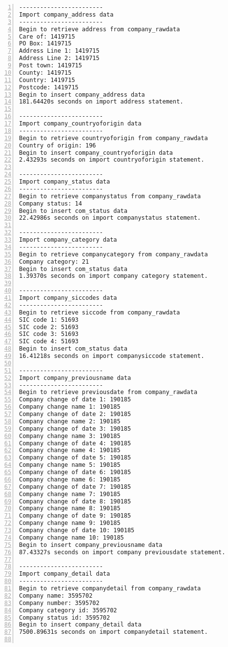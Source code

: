 \begin{lstlisting}[breaklines, frame=single, numbers=left, caption={Execution of Company Migration Program.}, label=commandline-02]
------------------------
Import company_address data 
------------------------
Begin to retrieve address from company_rawdata
Care of: 1419715 
PO Box: 1419715 
Address Line 1: 1419715 
Address Line 2: 1419715 
Post town: 1419715 
County: 1419715 
Country: 1419715 
Postcode: 1419715 
Begin to insert company_address data
181.64420s seconds on import address statement. 

------------------------
Import company_countryoforigin data 
------------------------
Begin to retrieve countryoforigin from company_rawdata
Country of origin: 196 
Begin to insert company_countryoforigin data
2.43293s seconds on import countryoforigin statement. 

------------------------
Import company_status data 
------------------------
Begin to retrieve companystatus from company_rawdata
Company status: 14 
Begin to insert com_status data
22.42986s seconds on import companystatus statement. 

------------------------
Import company_category data 
------------------------
Begin to retrieve companycategory from company_rawdata
Company category: 21 
Begin to insert com_status data
1.39370s seconds on import company category statement. 

------------------------
Import company_siccodes data 
------------------------
Begin to retrieve siccode from company_rawdata
SIC code 1: 51693 
SIC code 2: 51693 
SIC code 3: 51693 
SIC code 4: 51693 
Begin to insert com_status data
16.41218s seconds on import companysiccode statement. 

------------------------
Import company_previousname data 
------------------------
Begin to retrieve previousdate from company_rawdata
Company change of date 1: 190185 
Company change name 1: 190185 
Company change of date 2: 190185 
Company change name 2: 190185 
Company change of date 3: 190185 
Company change name 3: 190185 
Company change of date 4: 190185 
Company change name 4: 190185 
Company change of date 5: 190185 
Company change name 5: 190185 
Company change of date 6: 190185 
Company change name 6: 190185 
Company change of date 7: 190185 
Company change name 7: 190185 
Company change of date 8: 190185 
Company change name 8: 190185 
Company change of date 9: 190185 
Company change name 9: 190185 
Company change of date 10: 190185 
Company change name 10: 190185 
Begin to insert company_previousname data
87.43327s seconds on import company previousdate statement. 

------------------------
Import company_detail data 
------------------------
Begin to retrieve companydetail from company_rawdata
Company name: 3595702 
Company number: 3595702 
Company category id: 3595702 
Company status id: 3595702 
Begin to insert company_detail data
7500.89631s seconds on import companydetail statement. 


\end{lstlisting}
